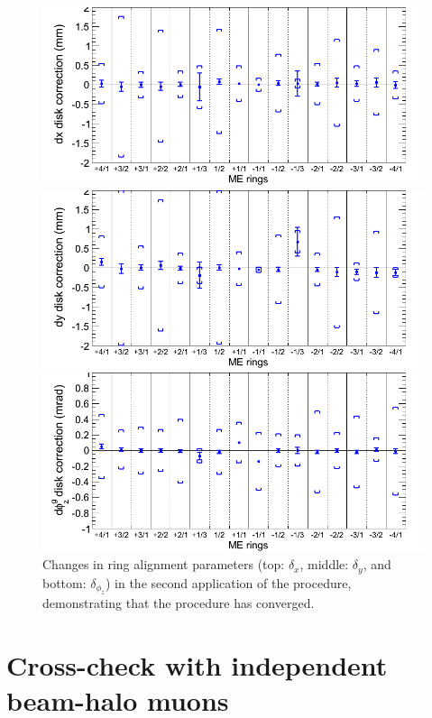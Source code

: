 \documentclass[12pt]{article}
\begin{document}
\begin{figure}
\begin{center}
\includegraphics[width=0.85\linewidth]{seconditer1.png}

\includegraphics[width=0.85\linewidth]{seconditer2.png}

\includegraphics[width=0.85\linewidth]{seconditer3.png}
\end{center}

\caption{Changes in ring alignment parameters (top: $\delta_x$,
  middle: $\delta_y$, and bottom: $\delta_{\phi_z}$) in the second
  application of the procedure, demonstrating that the procedure has
  converged. \label{fig:seconditer}}
\end{figure}

\section{Cross-check with independent beam-halo muons}
\end{document}
